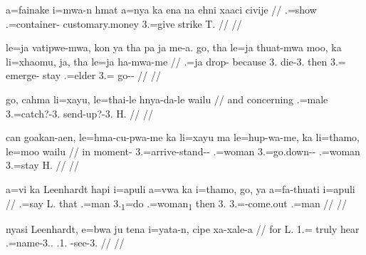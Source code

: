 \a
\begingl
\gla 
a=fainake i=mwa-n hmat a=nya ka ena na ehni xaaci civije
// .=show .=container- customary.money 3.=give     strike T.
// \glft {}
// \endgl

\a
\begingl
\gla 
le=ja vatipwe-mwa, kon ya tha pa ja me-a. go, tha le=ja thuat-mwa moo, ka li=xhaomu, ja, tha le=ja ha-mwa-me
// .=ja drop- because 3.    die-3. then  3.= emerge- stay  .=elder   3.= go--
// \glft  {}
// \endgl

\a
\begingl
\gla 
go, cahma li=xayu, le=thai-le hnya-da-le wailu
// \glb and concerning .=male 3.=catch?-3. send-up?-3. H.
// \glft {}
// \endgl

\a
\begingl
\gla can goakan-aen, le=hma-cu-pwa-me ka li=xayu ma le=hup-wa-me, ka li=thamo, le=moo wailu
// \glb in moment- 3.=arrive-stand--  .=woman  3.=go.down--  .=woman 3.=stay H.
// \glft {}
// \endgl

\a
\begingl
\gla a=vi ka Leenhardt hapi i=apuli a=vwa ka i=thamo, go, ya a=fa-thuati i=apuli
// .=say  L. that .=man 3.\textsubscript{1}=do  .=woman\textsubscript{1} then 3. 3.=-come.out .=man
// \glft {}
// \endgl

\a
\begingl
\gla 
nyasi Leenhardt, e=bwa ju tena i=yata-n, cipe xa-xale-a
// \glb for L. 1.= truly hear .=name-3.. .1. -see-3.
// \glft {}
// \endgl
\xe
 


%
